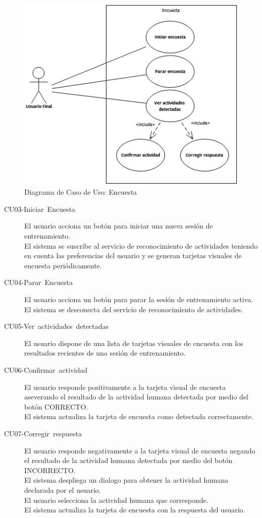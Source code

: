 \begin{figure}[H]
\begin{centering}
\includegraphics{capitulo-5/graphics/caso_encuesta}
\par\end{centering}
\caption[Diagrama de Caso de Uso: Encuesta]{\label{fig5:uc-encuesta}Diagrama de Caso de Uso: Encuesta}

\end{figure}

\begin{description}
\item [{CU03-Iniciar~Encuesta}] El usuario acciona un botón para iniciar
una nueva sesión de entrenamiento. \\
El sistema se suscribe al servicio de reconocimiento de actividades
teniendo en cuenta las preferencias del usuario y se generan tarjetas
visuales de encuesta periódicamente.
\item [{CU04-Parar~Encuesta}] El usuario acciona un botón para parar la
sesión de entrenamiento activa. \\
El sistema se desconecta del servicio de reconocimiento de actividades.
\item [{CU05-Ver~actividades~detectadas}] El usuario dispone de una lista
de tarjetas visuales de encuesta con los resultados recientes de una
sesión de entrenamiento. 
\item [{CU06-Confirmar~actividad}] El usuario responde positivamente a
la tarjeta visual de encuesta aseverando el resultado de la actividad
humana detectada por medio del botón \flqq{}CORRECTO\frqq{}. \\
El sistema actualiza la tarjeta de encuesta como detectada correctamente.
\item [{CU07-Corregir~respuesta}] El usuario responde negativamente a
la tarjeta visual de encuesta negando el resultado de la actividad
humana detectada por medio del botón \flqq{}INCORRECTO\frqq{}. \\
El sistema despliega un dialogo para obtener la actividad humana declarada
por el usuario.\\
El usuario selecciona la actividad humana que corresponde. \\
El sistema actualiza la tarjeta de encuesta con la respuesta del usuario.
\end{description}

